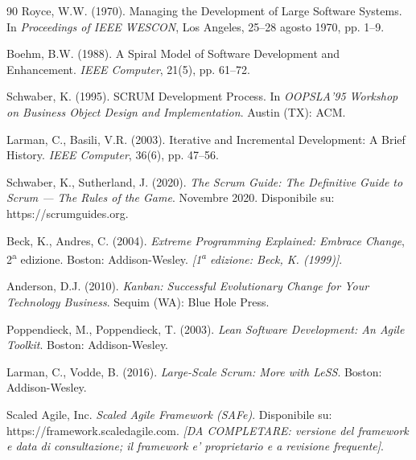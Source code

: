 \begin{thebibliography}{90}
 Royce, W.W. (1970). Managing the Development of Large
  Software Systems. In \emph{Proceedings of IEEE WESCON}, Los Angeles, 25--28
  agosto 1970, pp. 1--9.

 Boehm, B.W. (1988). A Spiral Model of Software Development
  and Enhancement. \emph{IEEE Computer}, 21(5), pp. 61--72.

 Schwaber, K. (1995). SCRUM Development Process. In
  \emph{OOPSLA'95 Workshop on Business Object Design and Implementation}. Austin
  (TX): ACM.

 Larman, C., Basili, V.R. (2003). Iterative and Incremental
  Development: A Brief History. \emph{IEEE Computer}, 36(6), pp. 47--56.


 Schwaber, K., Sutherland, J. (2020). \emph{The Scrum
  Guide: The Definitive Guide to Scrum --- The Rules of the Game}. Novembre
  2020. Disponibile su: https://scrumguides.org.

 Beck, K., Andres, C. (2004). \emph{Extreme Programming
  Explained: Embrace Change}, 2\textsuperscript{a} edizione. Boston:
  Addison-Wesley. \emph{[1\textsuperscript{a} edizione: Beck, K. (1999)]}.

 Anderson, D.J. (2010). \emph{Kanban: Successful
  Evolutionary Change for Your Technology Business}. Sequim (WA): Blue Hole
  Press.

 Poppendieck, M., Poppendieck, T. (2003). \emph{Lean
  Software Development: An Agile Toolkit}. Boston: Addison-Wesley.


 Larman, C., Vodde, B. (2016). \emph{Large-Scale Scrum:
  More with LeSS}. Boston: Addison-Wesley.

 Scaled Agile, Inc. \emph{Scaled Agile Framework (SAFe)}.
  Disponibile su: https://framework.scaledagile.com. \emph{[DA COMPLETARE:
  versione del framework e data di consultazione; il framework e' proprietario e
  a revisione frequente]}.


\end{thebibliography}
